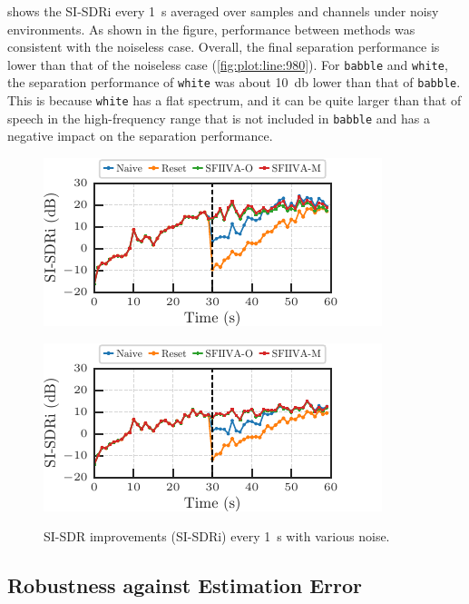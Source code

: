 \documentclass[sip,biber]{now-journal}
\begin{document}
 shows the SI-SDRi every \SI{1}{\second} averaged over samples and channels under noisy environments.
As shown in the figure, performance between methods was consistent with the noiseless case.
Overall, the final separation performance is lower than that of the noiseless case (\cref{fig:plot:line:980}).
For \texttt{babble} and \texttt{white}, the separation performance of \texttt{white} was about \SI{10}{\decibel} lower than that of \texttt{babble}.
This is because \texttt{white} has a flat spectrum, and it can be quite larger than that of speech in the high-frequency range that is not included in \texttt{babble} and has a negative impact on the separation performance.
\begin{figure}[t]
  \centering
  \begin{minipage}[t]{.45\textwidth}
    \centering\includegraphics{figures/plots/babble-norm/line_980.pdf}\label{fig:plot:line:980:babble}
  \end{minipage}
  \hspace{.05\textwidth}
  \begin{minipage}[t]{.45\textwidth}
    \centering\includegraphics{figures/plots/white-norm/line_980.pdf}\label{fig:plot:line:980:white}
  \end{minipage}
  \caption{SI-SDR improvements (SI-SDRi) every \SI{1}{\second} with various noise.}%
  \label{fig:plot:line:noise}
\end{figure}

\subsection{Robustness against Estimation Error}
\end{document}
